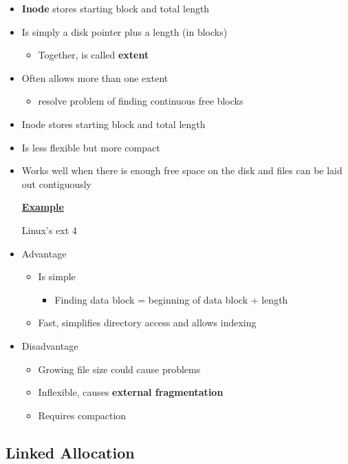 \documentclass[12pt]{article}
\begin{document}
\begin{itemize}
    \item \textbf{Inode} stores starting block and total length
    \item Is simply a disk pointer plus a length (in blocks)
    \begin{itemize}
        \item Together, is called \textbf{extent}
    \end{itemize}
    \item Often allows more than one extent
    \begin{itemize}
        \item resolve problem of finding continuous free blocks
    \end{itemize}
    \item Inode stores starting block and total length
    \item Is less flexible but more compact
    \item Works well when there is enough free space on the disk and files can be laid out contiguously

    \bigskip

    \underline{\textbf{Example}}

    \bigskip

    Linux's ext 4

    \item Advantage

    \begin{itemize}
        \item Is simple
        \begin{itemize}
            \item Finding data block = beginning of data block + length
        \end{itemize}
        \item Fast, simplifies directory access and allows indexing
    \end{itemize}

    \item Disadvantage
    \begin{itemize}
        \item Growing file size could cause problems
        \item Inflexible, causes \textbf{external fragmentation}
        \item Requires compaction
    \end{itemize}
\end{itemize}

\subsection{Linked Allocation}
\end{document}
